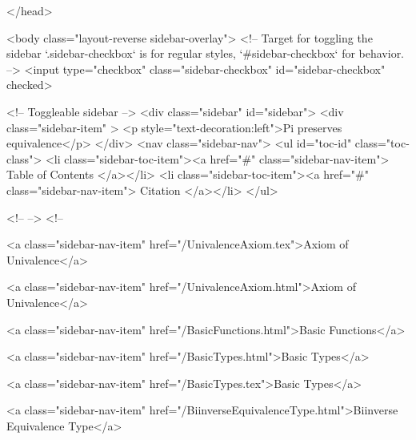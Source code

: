   
</head>




  <body class="layout-reverse sidebar-overlay">
    <!-- Target for toggling the sidebar `.sidebar-checkbox` is for regular
     styles, `#sidebar-checkbox` for behavior. -->
<input type="checkbox" class="sidebar-checkbox" id="sidebar-checkbox" checked>

<!-- Toggleable sidebar -->
<div class="sidebar" id="sidebar">
  <div class="sidebar-item" >
    <p style="text-decoration:left">Pi preserves equivalence</p>
  </div>
  <nav class="sidebar-nav">
    <ul id="toc-id" class="toc-class">
  <li class="sidebar-toc-item"><a href="#" class="sidebar-nav-item"> Table of Contents </a></li>
  <li class="sidebar-toc-item"><a href="#" class="sidebar-nav-item"> Citation </a></li>
</ul>


    <!--  -->
    <!-- 
      
    
      
    
      
    
      
    
      
        
      
    
      
        
          <a class="sidebar-nav-item" href="/UnivalenceAxiom.tex">Axiom of Univalence</a>
        
      
    
      
        
          <a class="sidebar-nav-item" href="/UnivalenceAxiom.html">Axiom of Univalence</a>
        
      
    
      
        
          <a class="sidebar-nav-item" href="/BasicFunctions.html">Basic Functions</a>
        
      
    
      
        
          <a class="sidebar-nav-item" href="/BasicTypes.html">Basic Types</a>
        
      
    
      
        
          <a class="sidebar-nav-item" href="/BasicTypes.tex">Basic Types</a>
        
      
    
      
        
          <a class="sidebar-nav-item" href="/BiinverseEquivalenceType.html">Biinverse Equivalence Type</a>
        
